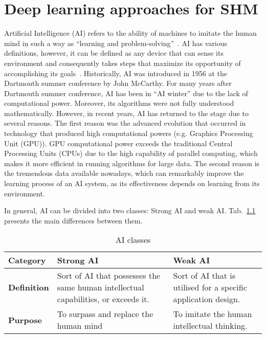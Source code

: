 \chapter[Deep learning for SHM]{Deep learning approaches for SHM}
\label{ch3}
Artificial Intelligence (AI) refers to the ability of machines to imitate the human mind in such a way as  \enquote{learning and problem-solving}~\cite{Russell2010}.
AI has various definitions, however, it can be defined as any device that can sense its environment and consequently takes steps that maximize its opportunity of accomplishing its goals~\cite{Russell2010}.
Historically, AI was introduced in 1956 at the Dartmouth summer conference by John McCarthy.
For many years after Dartmouth summer conference, AI has been in \enquote{AI winter} due to the lack of computational power.
Moreover, its algorithms were not fully understood mathematically.
However, in recent years, AI has returned to the stage due to several reasons. 
The first reason was the advanced evolution that occurred in technology that produced high computational powers (e.g. Graphics Processing Unit (GPU)). 
GPU computational power exceeds the traditional Central Processing Units (CPUs) due to the high capability of parallel computing, which makes it more efficient in running algorithms for large data.
The second reason is the tremendous data available nowadays, which can remarkably improve the learning process of an AI system, as its effectiveness depends on learning from its environment. 

In general, AI can be divided into two classes: Strong AI and weak AI. Tab.~\ref{tab:Strong_Weak_AI} presents the main differences between them.
\begin{table}[h]
	\renewcommand{\arraystretch}{1.1}
	\centering
	\caption{AI classes}
	\scriptsize
	\begin{tabular}{p{2cm}p{4cm}p{4cm}} 
		\toprule
		\textbf{Category} & \textbf{Strong AI} & \textbf{Weak AI} \\ \midrule
		\textbf{Definition} & Sort of AI that possesses the same human intellectual capabilities, or exceeds it. & Sort of AI that is utilised for a specific application design. \\ \midrule
		
		\textbf{Purpose} &To surpass and replace the human mind  &  To imitate the human intellectual thinking. \\  
		\bottomrule
	\end{tabular}
	\label{tab:Strong_Weak_AI}
\end{table}
